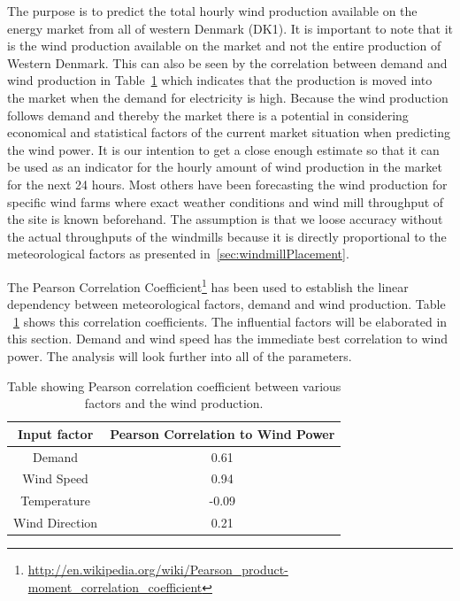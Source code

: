The purpose is to predict the total hourly wind production available on the energy market from all of western Denmark (DK1). It is important to note that it is the wind production available on the market and not the entire production of Western Denmark. This can also be seen by the correlation between demand and wind production in Table~\ref{table:pearsonCoeficientWindProduction} which indicates that the production is moved into the market when the demand for electricity is high. Because the wind production follows demand and thereby the market there is a potential in considering  economical and statistical factors of the current market situation when predicting the wind power. It is our intention to get a close enough estimate so that it can be used as an indicator for the hourly amount of wind production in the market for the next 24 hours.
Most others have been forecasting the wind production for specific wind farms where exact weather conditions and wind mill throughput of the site is known beforehand. The assumption is that we loose accuracy without the actual throughputs of the windmills because it is directly proportional to the meteorological factors as presented in~\ref{sec:windmillPlacement}. 

The Pearson Correlation Coefficient\footnote{\url{http://en.wikipedia.org/wiki/Pearson_product-moment_correlation_coefficient}} has been used to establish the linear dependency between meteorological factors, demand and wind production. Table ~\ref{table:pearsonCoeficientWindProduction} shows this correlation coefficients. The influential factors will be elaborated in this section. Demand and wind speed has the immediate best correlation to wind power. The analysis will look further into all of the parameters.

\begin{table}[H]
\centering  %
\begin{tabular}{|c|c|} %
\hline
Input factor & Pearson Correlation to Wind Power \\ 
\hline                  %
Demand & 0.61 \\ \hline %
Wind Speed & 0.94 \\ \hline
Temperature & -0.09 \\ \hline
Wind Direction & 0.21 \\
\hline %
\end{tabular}
\caption{Table showing Pearson correlation coefficient between various factors and the wind production.} %
\label{table:pearsonCoeficientWindProduction} %
\end{table}

